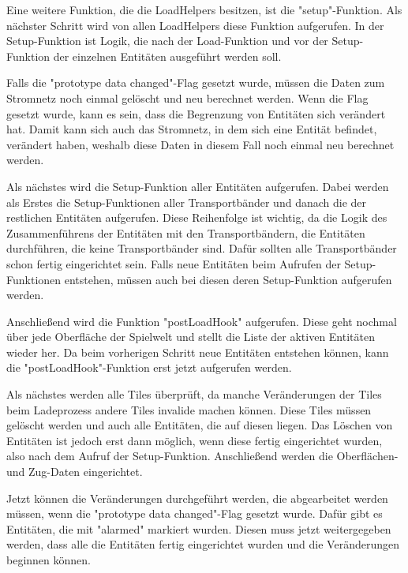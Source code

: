 Eine weitere Funktion, die die LoadHelpers besitzen, ist die "setup"-Funktion. Als nächster Schritt wird von allen LoadHelpers diese Funktion aufgerufen. In der Setup-Funktion ist Logik, die nach der Load-Funktion und vor der Setup-Funktion der einzelnen Entitäten ausgeführt werden soll.\cite{factorioGithubSaveLoad}

Falls die "prototype data changed"-Flag gesetzt wurde, müssen die Daten zum Stromnetz noch einmal gelöscht und neu berechnet werden. Wenn die Flag gesetzt wurde, kann es sein, dass die Begrenzung von Entitäten sich verändert hat. Damit kann sich auch das Stromnetz, in dem sich eine Entität befindet, verändert haben, weshalb diese Daten in diesem Fall noch einmal neu berechnet werden.\cite{factorioGithubSaveLoad}

Als nächstes wird die Setup-Funktion aller Entitäten aufgerufen. Dabei werden als Erstes die Setup-Funktionen aller Transportbänder und danach die der restlichen Entitäten aufgerufen. Diese Reihenfolge ist wichtig, da die Logik des Zusammenführens der Entitäten mit den Transportbändern, die Entitäten durchführen, die keine Transportbänder sind. Dafür sollten alle Transportbänder schon fertig eingerichtet sein. Falls neue Entitäten beim Aufrufen der Setup-Funktionen entstehen, müssen auch bei diesen deren Setup-Funktion aufgerufen werden.\cite{factorioGithubSaveLoad}

Anschließend wird die Funktion "postLoadHook" aufgerufen. Diese geht nochmal über jede Oberfläche der Spielwelt und stellt die Liste der aktiven Entitäten wieder her. Da beim vorherigen Schritt neue Entitäten entstehen können, kann die "postLoadHook"-Funktion erst jetzt aufgerufen werden.\cite{factorioGithubSaveLoad} 

Als nächstes werden alle Tiles überprüft, da manche Veränderungen der Tiles beim Ladeprozess andere Tiles invalide machen können. Diese Tiles müssen gelöscht werden und auch alle Entitäten, die auf diesen liegen. Das Löschen von Entitäten ist jedoch erst dann möglich, wenn diese fertig eingerichtet wurden, also nach dem Aufruf der Setup-Funktion. Anschließend werden die Oberflächen- und Zug-Daten eingerichtet.\cite{factorioGithubSaveLoad}

Jetzt können die Veränderungen durchgeführt werden, die abgearbeitet werden müssen, wenn die "prototype data changed"-Flag gesetzt wurde. Dafür gibt es Entitäten, die mit "alarmed" markiert wurden. Diesen muss jetzt weitergegeben werden, dass alle die Entitäten fertig eingerichtet wurden und die Veränderungen beginnen können.\cite{factorioGithubSaveLoad}

